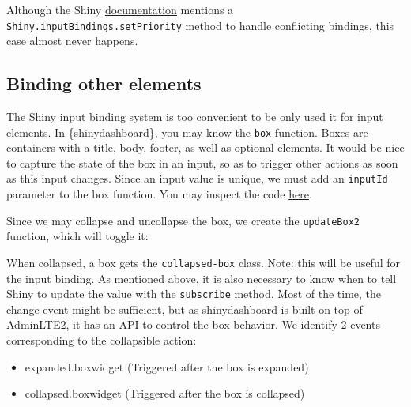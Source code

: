 \documentclass[
]{book}
\newenvironment{Shaded}{\begin{snugshade}}{\end{snugshade}}
\newcommand{\ControlFlowTok}[1]{\textcolor[rgb]{0.13,0.29,0.53}{\textbf{#1}}}
\newcommand{\DataTypeTok}[1]{\textcolor[rgb]{0.13,0.29,0.53}{#1}}
\newcommand{\KeywordTok}[1]{\textcolor[rgb]{0.13,0.29,0.53}{\textbf{#1}}}
\newcommand{\NormalTok}[1]{#1}
\newcommand{\OperatorTok}[1]{\textcolor[rgb]{0.81,0.36,0.00}{\textbf{#1}}}
\newcommand{\OtherTok}[1]{\textcolor[rgb]{0.56,0.35,0.01}{#1}}
\newcommand{\StringTok}[1]{\textcolor[rgb]{0.31,0.60,0.02}{#1}}
\providecommand{\tightlist}{%
  \setlength{\itemsep}{0pt}\setlength{\parskip}{0pt}}
\begin{document}
Although the Shiny \href{https://shiny.rstudio.com/articles/building-inputs.html}{documentation} mentions a \texttt{Shiny.inputBindings.setPriority} method to handle conflicting bindings, this case almost never happens.

\hypertarget{binding-other-elements}{%
\subsection{Binding other elements}\label{binding-other-elements}}

The Shiny input binding system is too convenient to be only used it for input elements. In \{shinydashboard\}, you may know the \texttt{box} function. Boxes are containers with a title, body, footer, as well as optional elements. It would be nice to capture the state of the box in an input, so as to trigger other actions as soon as this input changes. Since an input value is unique, we must add an \texttt{inputId} parameter to the box function. You may inspect the code \href{https://github.com/DivadNojnarg/outstanding-shiny-ui-code/blob/master/R/box2.R}{here}.

Since we may collapse and uncollapse the box, we create the \texttt{updateBox2} function, which will toggle it:

\begin{Shaded}
\end{Shaded}

When collapsed, a box gets the \texttt{collapsed-box} class. Note: this will be useful for the input binding. As mentioned above, it is also necessary to know when to tell Shiny to update the value with the \texttt{subscribe} method. Most of the time, the change event might be sufficient, but as shinydashboard is built on top of \href{https://adminlte.io/docs/2.4/js-box-widget}{AdminLTE2}, it has an API to control the box behavior. We identify 2 events corresponding to the collapsible action:

\begin{itemize}
\tightlist
\item
  expanded.boxwidget (Triggered after the box is expanded)
\item
  collapsed.boxwidget (Triggered after the box is collapsed)
\end{itemize}
\end{document}
